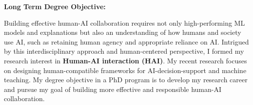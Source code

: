 


\noindent \textbf{Long Term Degree Objective:}
\noindent

Building effective human-AI collaboration requires not only high-performing ML models and explanations but also an understanding of how humans and society use AI, such as retaining human agency and appropriate reliance on AI. Intrigued by this interdisciplinary approach and human-centered perspective, I formed my research interest in \textbf{Human-AI interaction (HAI)}.
My recent research focuses on designing human-compatible frameworks for AI-decision-support and machine teaching.
My degree objective in a PhD program is to develop my research career and pursue my goal of building more effective and responsible human-AI collaboration. 






